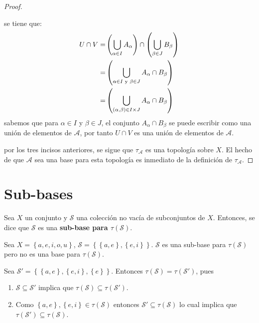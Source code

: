 \documentclass[12pt]{report}
\theoremstyle{largebreak}
\begin{document}
\begin{proof}
\begin{enumerate}
            se tiene que:
            \begin{equation*}
                \begin{split}
                    U\cap V =& \left(\bigcup_{\alpha\in I}A_\alpha\right) \cap \left(\bigcup_{\beta\in J}B_\beta\right)\\
                    =& \left(\bigcup_{\alpha\in I\textup{ y }\beta\in J}A_\alpha\cap B_\beta\right)\\
                    =& \left(\bigcup_{(\alpha,\beta)\in I\times J}A_\alpha\cap B_\beta\right)\\
                \end{split}
            \end{equation*}
            sabemos que para $\alpha\in I$ y $\beta\in J$, el conjunto $A_\alpha\cap B_\beta$ se puede escribir como una unión de elementos de $\mathcal{A}$, por tanto $U\cap V$ es una unión de elementos de $\mathcal{A}$.
        \end{enumerate}
        por los tres incisos anteriores, se sigue que $\tau_{\mathcal{A}}$ es una topología sobre $X$. El hecho de que $\mathcal{A}$ sea una base para esta topología es inmediato de la definición de $\tau_{\mathcal{A}}$.
    \end{proof}

    \section{Sub-bases}

    \begin{mydef}
        Sea $X$ un conjunto y $\mathcal{S}$ una colección no vacía de subconjuntos de $X$. Entonces, se dice que $\mathcal{S}$ es una \textbf{sub-base para $\tau(\mathcal{S})$}.
    \end{mydef}

    \begin{exa}
        Sea $X=\left\{a,e,i,o,u\right\}$, $\mathcal{S}=\left\{\left\{a,e\right\},\left\{e,i\right\} \right\}$. $\mathcal{S}$ es una sub-base para $\tau(\mathcal{S})$ pero no es una base para $\tau(\mathcal{S})$.

        Sea $\mathcal{S}'=\left\{\left\{a,e\right\},\left\{e,i\right\},\left\{e\right\} \right\}$. Entonces $\tau(\mathcal{S})=\tau(\mathcal{S}')$, pues 
        \begin{enumerate}
            \item $\mathcal{S}\subseteq\mathcal{S}'$ implica que $\tau(\mathcal{S})\subseteq\tau(\mathcal{S}')$.
            \item Como $\left\{a,e\right\},\left\{e,i\right\}\in\tau(\mathcal{S})$ entonces $\mathcal{S}'\subseteq\tau(\mathcal{S})$ lo cual implica que $\tau(\mathcal{S}')\subseteq\tau(\mathcal{S})$.
        \end{enumerate}
    \end{exa}
\end{document}
